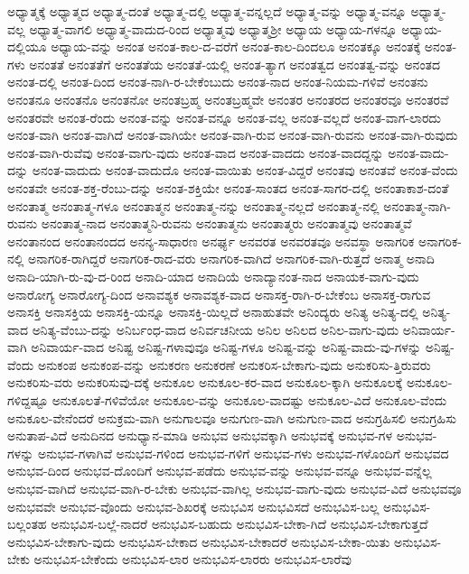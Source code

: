 {ಅಧ್ಯಾತ್ಮಕ್ಕೆ
ಅಧ್ಯಾತ್ಮದ
ಅಧ್ಯಾತ್ಮ-ದಂತೆ
ಅಧ್ಯಾತ್ಮ-ದಲ್ಲಿ
ಅಧ್ಯಾತ್ಮ-ವನ್ನಲ್ಲದೆ
ಅಧ್ಯಾತ್ಮ-ವನ್ನು
ಅಧ್ಯಾತ್ಮ-ವನ್ನೂ
ಅಧ್ಯಾತ್ಮ-ವಲ್ಲ
ಅಧ್ಯಾತ್ಮ-ವಾಗಲಿ
ಅಧ್ಯಾತ್ಮ-ವಾದುದ-ರಿಂದ
ಅಧ್ಯಾತ್ಮವು
ಅಧ್ಯಾತ್ಮಶ್ರೀ
ಅಧ್ಯಾಯ
ಅಧ್ಯಾಯ-ಗಳನ್ನೂ
ಅಧ್ಯಾಯ-ದಲ್ಲಿಯೂ
ಅಧ್ಯಾಯ-ವನ್ನು
ಅನಂತ
ಅನಂತ-ಕಾಲ-ದ-ವರೆಗೆ
ಅನಂತ-ಕಾಲ-ದಿಂದಲೂ
ಅನಂತಕ್ಕೂ
ಅನಂತಕ್ಕೆ
ಅನಂತ-ಗಳು
ಅನಂತತೆ
ಅನಂತತೆಗೆ
ಅನಂತತೆಯ
ಅನಂತತೆ-ಯಲ್ಲಿ
ಅನಂತ-ತ್ಯಾಗ
ಅನಂತತ್ವದ
ಅನಂತತ್ವ-ವನ್ನು
ಅನಂತದ
ಅನಂತ-ದಲ್ಲಿ
ಅನಂತ-ದಿಂದ
ಅನಂತ-ನಾಗಿ-ರ-ಬೇಕೆಂಬುದು
ಅನಂತ-ನಾದ
ಅನಂತ-ನಿಯಮ-ಗಳಿವೆ
ಅನಂತನು
ಅನಂತನೂ
ಅನಂತನೊ
ಅನಂತನೋ
ಅನಂತಬ್ರಹ್ಮ
ಅನಂತಬ್ರಹ್ಮವೇ
ಅನಂತರ
ಅನಂತರದ
ಅನಂತರವೂ
ಅನಂತರವೆ
ಅನಂತರವೇ
ಅನಂತ-ರೆಂದು
ಅನಂತ-ವನ್ನು
ಅನಂತ-ವನ್ನೂ
ಅನಂತ-ವಲ್ಲ
ಅನಂತ-ವಲ್ಲದೆ
ಅನಂತ-ವಾಗ-ಲಾರದು
ಅನಂತ-ವಾಗಿ
ಅನಂತ-ವಾಗಿದೆ
ಅನಂತ-ವಾಗಿಯೇ
ಅನಂತ-ವಾಗಿ-ರುವ
ಅನಂತ-ವಾಗಿ-ರುವನು
ಅನಂತ-ವಾಗಿ-ರುವುದು
ಅನಂತ-ವಾಗಿ-ರುವೆವು
ಅನಂತ-ವಾಗು-ವುದು
ಅನಂತ-ವಾದ
ಅನಂತ-ವಾದದು
ಅನಂತ-ವಾದದ್ದನ್ನು
ಅನಂತ-ವಾದು-ದನ್ನು
ಅನಂತ-ವಾದುದು
ಅನಂತ-ವಾದುದೊ
ಅನಂತ-ವಾಯಿತು
ಅನಂತ-ವಿದ್ದರೆ
ಅನಂತವು
ಅನಂತವೆ
ಅನಂತ-ವೆಂದು
ಅನಂತವೇ
ಅನಂತ-ಶಕ್ತ-ರೆಂಬು-ದನ್ನು
ಅನಂತ-ಶಕ್ತಿಯೇ
ಅನಂತ-ಸಾಂತದ
ಅನಂತ-ಸಾಗರ-ದಲ್ಲಿ
ಅನಂತಾಕಾಶ-ದಂತೆ
ಅನಂತಾತ್ಮ
ಅನಂತಾತ್ಮ-ಗಳೂ
ಅನಂತಾತ್ಮನ
ಅನಂತಾತ್ಮ-ನನ್ನು
ಅನಂತಾತ್ಮ-ನಲ್ಲದೆ
ಅನಂತಾತ್ಮ-ನಲ್ಲಿ
ಅನಂತಾತ್ಮ-ನಾಗಿ-ರುವನು
ಅನಂತಾತ್ಮ-ನಾದ
ಅನಂತಾತ್ಮನಿ-ರುವನು
ಅನಂತಾತ್ಮನು
ಅನಂತಾತ್ಮರು
ಅನಂತಾತ್ಮವು
ಅನಂತಾತ್ಮವೆ
ಅನಂತಾನಂದ
ಅನಂತಾನಂದದ
ಅನನ್ಯ-ಸಾಧಾರಣ
ಅನರ್ಘ್ಯ
ಅನವರತ
ಅನವರತವೂ
ಅನವಸ್ಥಾ
ಅನಾಗರಿಕ
ಅನಾಗರಿಕ-ನಲ್ಲಿ
ಅನಾಗರಿಕ-ರಾಗಿದ್ದರೆ
ಅನಾಗರಿಕ-ರಾದ-ವರು
ಅನಾಗರಿಕ-ವಾಗಿದೆ
ಅನಾಗರಿಕ-ವಾಗಿ-ರುತ್ತದೆ
ಅನಾತ್ಮ
ಅನಾದಿ
ಅನಾದಿ-ಯಾಗಿ-ರು-ವು-ದ-ರಿಂದ
ಅನಾದಿ-ಯಾದ
ಅನಾದಿಯೆ
ಅನಾದ್ಯಾನಂತ-ನಾದ
ಅನಾಯಕ-ವಾಗು-ವುದು
ಅನಾರೋಗ್ಯ
ಅನಾರೋಗ್ಯ-ದಿಂದ
ಅನಾವಶ್ಯಕ
ಅನಾವಶ್ಯಕ-ವಾದ
ಅನಾಸಕ್ತ-ರಾಗಿ-ರ-ಬೇಕೆಂಬ
ಅನಾಸಕ್ತ-ರಾಗುವ
ಅನಾಸಕ್ತಿ
ಅನಾಸಕ್ತಿಯ
ಅನಾಸಕ್ತಿ-ಯನ್ನೂ
ಅನಾಸಕ್ತಿ-ಯಿಲ್ಲದೆ
ಅನಾಹುತವೇ
ಅನಿಂದ್ಯರು
ಅನಿತ್ಯ
ಅನಿತ್ಯ-ದಲ್ಲಿ
ಅನಿತ್ಯ-ವಾದ
ಅನಿತ್ಯ-ವೆಂಬು-ದನ್ನು
ಅನಿರ್ಬಂಧ-ವಾದ
ಅನಿರ್ವಚನೀಯ
ಅನಿಲ
ಅನಿಲದ
ಅನಿಲ-ವಾಗು-ವುದು
ಅನಿವಾರ್ಯ-ವಾಗಿ
ಅನಿವಾರ್ಯ-ವಾದ
ಅನಿಷ್ಟ
ಅನಿಷ್ಟ-ಗಳಾವುವೂ
ಅನಿಷ್ಟ-ಗಳೂ
ಅನಿಷ್ಟ-ವನ್ನು
ಅನಿಷ್ಟ-ವಾದು-ವು-ಗಳನ್ನು
ಅನಿಷ್ಟ-ವೆಂದು
ಅನುಕಂಪ
ಅನುಕಂಪ-ವನ್ನು
ಅನುಕರಣ
ಅನುಕರಣೆ
ಅನುಕರಿಸ-ಬೇಕಾಗು-ವುದು
ಅನುಕರಿಸು-ತ್ತಿರುವರು
ಅನುಕರಿಸು-ವರು
ಅನುಕರಿಸುವು-ದಕ್ಕೆ
ಅನುಕೂಲ
ಅನುಕೂಲ-ಕರ-ವಾದ
ಅನುಕೂಲ-ಕ್ಕಾಗಿ
ಅನುಕೂಲಕ್ಕೆ
ಅನುಕೂಲ-ಗಳಿದ್ದಷ್ಟೂ
ಅನುಕೂಲತೆ-ಗಳಿವೆಯೋ
ಅನುಕೂಲ-ವನ್ನು
ಅನುಕೂಲ-ವಾದಷ್ಟು
ಅನುಕೂಲ-ವಿದೆ
ಅನುಕೂಲ-ವೆಂದು
ಅನುಕೂಲ-ವೇನೆಂದರೆ
ಅನುಕ್ರಮ-ವಾಗಿ
ಅನುಗಾಲವೂ
ಅನುಗುಣ-ವಾಗಿ
ಅನುಗುಣ-ವಾದ
ಅನುಗ್ರಹಿಸಲಿ
ಅನುಗ್ರಹಿಸು
ಅನುತಾಪ-ವಿದೆ
ಅನುದಿನದ
ಅನುಧ್ಯಾನ-ಮಾಡಿ
ಅನುಭವ
ಅನುಭವಕ್ಕಾಗಿ
ಅನುಭವಕ್ಕೆ
ಅನುಭವ-ಗಳ
ಅನುಭವ-ಗಳನ್ನು
ಅನುಭವ-ಗಳಾಗಿವೆ
ಅನುಭವ-ಗಳಿಂದ
ಅನುಭವ-ಗಳಿಗೆ
ಅನುಭವ-ಗಳು
ಅನುಭವ-ಗಳೊಂದಿಗೆ
ಅನುಭವದ
ಅನುಭವ-ದಿಂದ
ಅನುಭವ-ದೊಂದಿಗೆ
ಅನುಭವ-ಪಡೆದು
ಅನುಭವ-ವನ್ನು
ಅನುಭವ-ವನ್ನೂ
ಅನುಭವ-ವನ್ನೆಲ್ಲ
ಅನುಭವ-ವಾಗಿದೆ
ಅನುಭವ-ವಾಗಿ-ರ-ಬೇಕು
ಅನುಭವ-ವಾಗಿಲ್ಲ
ಅನುಭವ-ವಾಗು-ವುದು
ಅನುಭವ-ವಿದೆ
ಅನುಭವವೂ
ಅನುಭವವೇ
ಅನುಭವ-ವೊಂದು
ಅನುಭವ-ಶಿಖರಕ್ಕೆ
ಅನುಭವಿಸ
ಅನುಭವಿಸದೆ
ಅನುಭವಿಸ-ಬಲ್ಲ
ಅನುಭವಿಸ-ಬಲ್ಲಂತಹ
ಅನುಭವಿಸ-ಬಲ್ಲೆ-ನಾದರೆ
ಅನುಭವಿಸ-ಬಹುದು
ಅನುಭವಿಸ-ಬೇಕಾ-ಗಿದೆ
ಅನುಭವಿಸ-ಬೇಕಾಗುತ್ತದೆ
ಅನುಭವಿಸ-ಬೇಕಾಗು-ವುದು
ಅನುಭವಿಸ-ಬೇಕಾದ
ಅನುಭವಿಸ-ಬೇಕಾದರೆ
ಅನುಭವಿಸ-ಬೇಕಾ-ಯಿತು
ಅನುಭವಿಸ-ಬೇಕು
ಅನುಭವಿಸ-ಬೇಕೆಂದು
ಅನುಭವಿಸ-ಲಾರ
ಅನುಭವಿಸ-ಲಾರರು
ಅನುಭವಿಸ-ಲಾರೆವು
}
